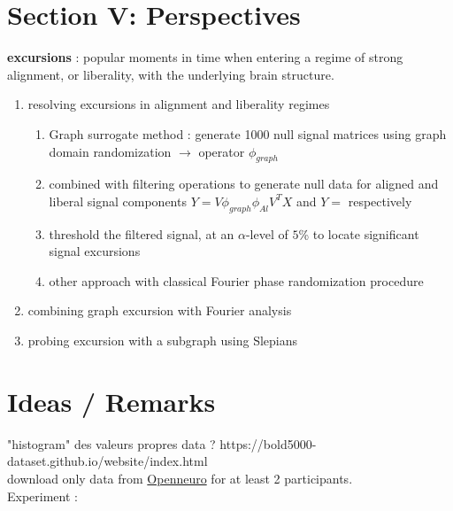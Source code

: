 \documentclass[12pt]{article}
\begin{document}
\section{Section V: Perspectives }
\textbf{excursions} : popular moments in time when entering a regime of strong alignment, or liberality, with the underlying brain structure. 
\begin{enumerate}
    \item resolving excursions in alignment and liberality regimes 
                \begin{enumerate}
                \item Graph surrogate method : generate 1000 null signal matrices using graph domain randomization $\rightarrow$ operator $\phi_{graph}$
                \item combined with filtering operations to generate null data for aligned and liberal signal components $Y=V\phi_{graph}\phi_{Al}V^TX$ and $Y= $ respectively 
                \item threshold the filtered signal, at an $\alpha$-level of $5$\% to locate significant signal excursions
                \item other approach with classical Fourier phase randomization procedure
            \end{enumerate}
    \item combining graph excursion with Fourier analysis
    \item probing excursion with a subgraph using Slepians
\end{enumerate}


\section{Ideas / Remarks }
"histogram" des valeurs propres 
data ? https://bold5000-dataset.github.io/website/index.html \\ 
download only data from \href{https://openneuro.org/datasets/ds001499/versions/1.3.0}{Openneuro} for at least 2 participants. \\ 

Experiment : \\
\end{document}
